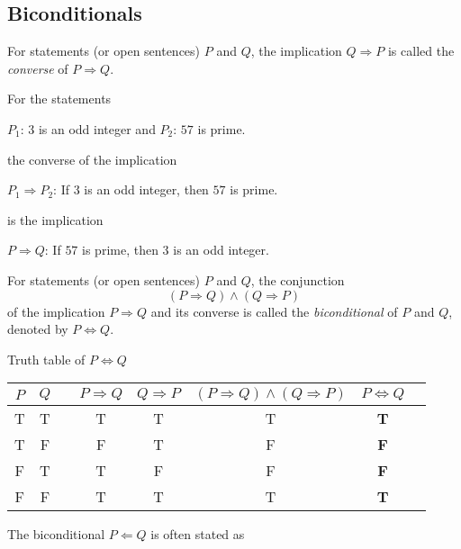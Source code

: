 \subsection{Biconditionals}
\begin{defi}[Converse]
    For statements (or open sentences) $P$ and $Q$, the implication $Q \Rightarrow P$ 
    is called the \emph{converse} of $P \Rightarrow Q$.
\end{defi}
\begin{eg}
     For the statements
     \begin{center}
          $P_1$: $3$ is an odd integer \qquad and \qquad $P_2$: $57$ is prime.
     \end{center} 
     the converse of the implication
     \begin{center}
          $P_1 \Rightarrow P_2$: If $3$ is an odd integer, then $57$ is prime.
     \end{center}
     is the implication
     \begin{center}
          $P \Rightarrow Q$: If $57$ is prime, then $3$ is an odd integer. 
     \end{center}
\end{eg}
\begin{defi}[Biconditional]
    For statements (or open sentences) $P$ and $Q$, the conjunction
    \begin{equation*}
         (P \Rightarrow Q) \wedge (Q \Rightarrow P)
    \end{equation*}
    of the implication $P \Rightarrow Q$ and its converse is called the
    \emph{biconditional} of $P$ and $Q$, denoted by $P \Leftrightarrow Q$.
\end{defi}
Truth table of $P \Leftrightarrow Q$
\begin{center}
    \begin{tabular}{cccccccc}
      \toprule
      $P$ & $Q$ &\quad & $P\Rightarrow Q$ & $Q\Rightarrow P$ & 
      $(P\Rightarrow Q) \wedge (Q\Rightarrow P)$ & $P \Leftrightarrow Q$\\
      \midrule
      T & T & & T & T & T & \textbf{T} \\
      T & F & & F & T & F & \textbf{F} \\
      F & T & & T & F & F & \textbf{F} \\
      F & F & & T & T & T & \textbf{T} \\
      \bottomrule
    \end{tabular}
\end{center}
The biconditional $P \Leftarrow Q$ is often stated as 
